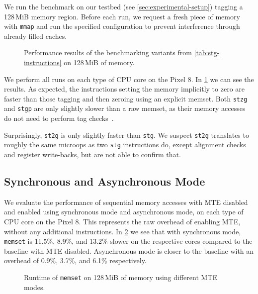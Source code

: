 We run the benchmark on our testbed (see \cref{sec:experimental-setup}) tagging a 128\,MiB memory region.
Before each run, we request a fresh piece of memory with \texttt{mmap} and run the specified configuration to prevent interference through already filled caches.

\begin{figure}[h]
    \centering
    
    \caption{Performance results of the benchmarking variants from \cref{tab:stg-instructions} on 128\,MiB of memory.}
    \label{fig:stg-performance}
\end{figure}

We perform all runs on each type of CPU core on the Pixel 8.
In \cref{fig:stg-performance} we can see the results.
As expected, the instructions setting the memory implicitly to zero are faster than those tagging and then zeroing using an explicit memset.
Both \texttt{stzg} and \texttt{stgp} are only slightly slower than a raw memset, as their memory accesses do not need to perform tag checks~\cite{ARMA2024Arch64}.

Surprisingly, \texttt{st2g} is only slightly faster than \texttt{stg}.
We suspect \texttt{st2g} translates to roughly the same microops as two \texttt{stg} instructions do, except alignment checks and register write-backs, but are not able to confirm that.

\subsection{Synchronous and Asynchronous Mode}
\label{subsec:synchronous-and-asynchronous-mode}

We evaluate the performance of sequential memory accesses with \ac{MTE} disabled and enabled using synchronous mode and asynchronous mode, on each type of CPU core on the Pixel 8.
This represents the raw overhead of enabling \ac{MTE}, without any additional instructions.
In \cref{fig:sync-async-performance} we see that with synchronous mode, \texttt{memset} is 11.5\%, 8.9\%, and 13.2\% slower on the respective cores compared to the baseline with \ac{MTE} disabled.
Asynchronous mode is closer to the baseline with an overhead of 0.9\%, 3.7\%, and 6.1\% respectively.

\begin{figure}[h]
    \centering
    
    \caption{Runtime of \texttt{memset} on 128\,MiB of memory using different \ac{MTE} modes.}
    \label{fig:sync-async-performance}
\end{figure}

